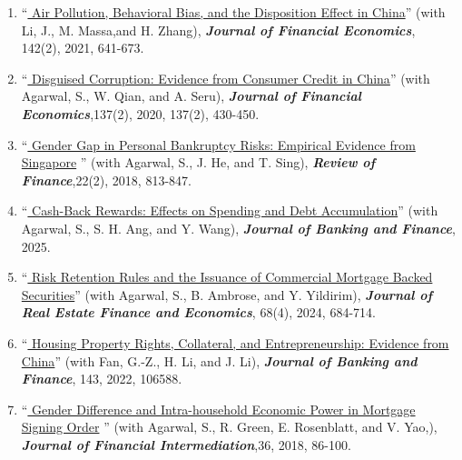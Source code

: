 \documentclass[margin,line]{res}
\begin{document}
\begin{resume}
\begin{enumerate}
\item %
``\href{https://www.sciencedirect.com/science/article/abs/pii/S0304405X19302223}{\color{black} Air Pollution, Behavioral Bias, and the Disposition Effect in China}'' (with Li, J., M. Massa,and H. Zhang), \textbf{\emph{Journal of Financial Economics}}, 142(2), 2021, 641-673.
\vspace*{0.2cm}	
\item %
``\href{https://www.sciencedirect.com/science/article/abs/pii/S0304405X20300611}{\color{black} Disguised Corruption: Evidence from Consumer Credit in China}'' (with Agarwal, S., W. Qian, and A. Seru), \textbf{\emph{Journal of Financial Economics}},137(2), 2020, 137(2), 430-450.	
\vspace*{0.2cm}	
\item %
 ``\href{https://academic.oup.com/rof/article-abstract/22/2/813/2629221}{\color{black} Gender Gap in Personal Bankruptcy Risks: Empirical Evidence from Singapore} '' (with Agarwal, S., J. He, and T. Sing), \textbf{\emph{Review of Finance}},22(2), 2018, 813-847.
\vspace*{0.2cm}
\item %
``\href{https://doi.org/10.1016/j.jbankfin.2025.107616}{\color{black} Cash-Back Rewards: Effects on Spending and Debt Accumulation}'' (with Agarwal, S., S. H. Ang, and Y. Wang), \textbf{\emph{Journal of Banking and Finance}}, 2025.
	\vspace*{0.2cm}
\item %
``\href{https://doi.org/10.1007/s11146-021-09837-1}{\color{black} Risk Retention Rules and the Issuance of Commercial Mortgage Backed Securities}'' (with Agarwal, S., B. Ambrose, and Y. Yildirim), \textbf{\emph{Journal of Real Estate Finance and Economics}}, 68(4), 2024, 684-714.
	\vspace*{0.2cm}
\item %
``\href{https://www.sciencedirect.com/science/article/abs/pii/S0378426622001844}{\color{black} Housing Property Rights, Collateral, and Entrepreneurship: Evidence from China}'' (with Fan, G.-Z., H. Li, and J. Li), \textbf{\emph{Journal of Banking and Finance}}, 143, 2022, 106588.
\vspace*{0.2cm}
\item ``\href{https://www.sciencedirect.com/science/article/abs/pii/S104295731830007X}{\color{black} Gender Difference and Intra-household Economic Power in Mortgage Signing Order} '' (with Agarwal, S., R. Green, E. Rosenblatt, and V. Yao,), \textbf{\emph{Journal of Financial Intermediation}},36, 2018, 86-100.	
\end{enumerate}


\end{resume}
\end{document}
